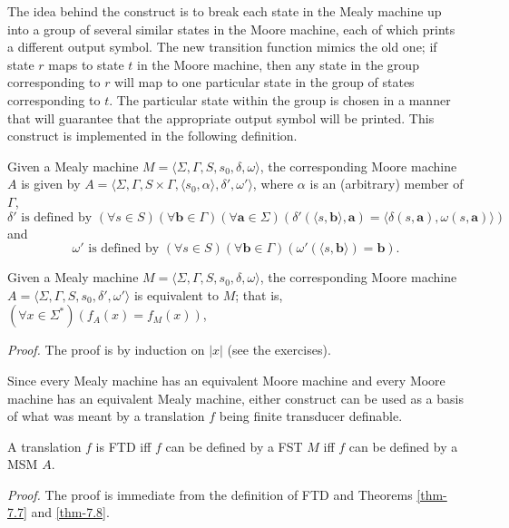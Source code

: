 The idea behind the construct is to break each state in the Mealy machine up
into a group of several similar states in the Moore machine, each of which
prints a different output symbol. The new transition function mimics the old
one; if state $r$ maps to state $t$ in the Moore machine, then any state in the
group corresponding to $r$ will map to one particular state in the group of
states corresponding to $t$. The particular state within the group is chosen in
a manner that will guarantee that the appropriate output symbol will be printed.
This construct is implemented in the following definition.

\begin{dfn}\label{dfn-7.20}
Given a Mealy machine $M=\langle\Sigma,\Gamma,S,s_0,\delta,\omega\rangle$, the
corresponding Moore machine $A$ is given by $A=\langle\Sigma,\Gamma,S \times
\Gamma,\langle s_0,\alpha\rangle,\delta',\omega'\rangle$, where $\alpha$ is
an (arbitrary) member of  $\Gamma$,
\[ \delta'\text{ is defined by }(\forall s \in S)(\forall\pmb{b}\in\Gamma)
	(\forall\pmb{a}\in\Sigma)(\delta'(\langle s,\pmb{b}\rangle, \pmb{a})
        =\langle\delta(s,\pmb{a}),\omega(s,\pmb{a})\rangle) \]
and
\[ \omega'\text{ is defined by }(\forall s \in S)(\forall\pmb{b}\in\Gamma)
	(\omega'(\langle s,\pmb{b}\rangle) = \pmb{b}). \]
\end{dfn}

\begin{thm}\label{thm-7.8}
Given a Mealy machine $M=\langle\Sigma,\Gamma,S,s_0,\delta,\omega\rangle$, the
corresponding Moore machine $A=\langle\Sigma,\Gamma,S,s_0,\delta',\omega'\rangle$
is equivalent to $M$; that is, $(\forall x \in \Sigma^*)(f_A(x)=f_M(x))$,

\emph{Proof.} The proof is by induction on $|x|$ (see the exercises).
\end{thm}

Since every Mealy machine has an equivalent Moore machine and every Moore
machine has an equivalent Mealy machine, either construct can be used as a
basis of what was meant by a translation $f$ being finite transducer definable.

\begin{cor}\label{cor-7.8}
A translation $f$ is FTD iff $f$ can be defined by a FST $M$ iff $f$ can be
defined by a MSM $A$.

\emph{Proof.} The proof is immediate from the definition of FTD and Theorems
\ref{thm-7.7} and \ref{thm-7.8}.
\end{cor}

